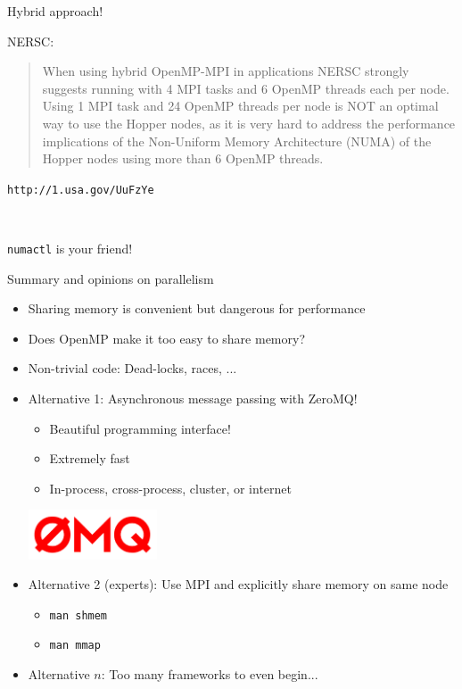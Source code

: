 \documentclass[sans,mathserif]{beamer}
\begin{document}
\begin{frame}{Hybrid approach!}

NERSC:
\begin{quote}
  When using hybrid OpenMP-MPI in applications NERSC strongly suggests
  running with 4 MPI tasks and 6 OpenMP threads each per node.  Using
  1 MPI task and 24 OpenMP threads per node is NOT an optimal way to
  use the Hopper nodes, as it is very hard to address the performance
  implications of the Non-Uniform Memory Architecture (NUMA) of the
  Hopper nodes using more than 6 OpenMP threads.
\end{quote}
{\small \tt http://1.usa.gov/UuFzYe}

~

{\tt numactl} is your friend!
\end{frame}

\begin{frame}{Summary and opinions on parallelism}
\begin{itemize}
  \item<+-> Sharing memory is convenient but dangerous for performance
  \item<+-> Does OpenMP make it too easy to share memory?
  \item<+-> Non-trivial code: Dead-locks, races, ...
  \item<+-> Alternative 1: Asynchronous message passing with ZeroMQ!
    \begin{itemize}
    \item Beautiful programming interface!
    \item Extremely fast
    \item In-process, cross-process, cluster, or internet
    \end{itemize}
    \includegraphics[width=0.3\textwidth]{zeromq.png}
  \item<+-> Alternative 2 (experts): Use MPI and explicitly share memory on same
     node
     \begin{itemize}
     \item {\tt man shmem}
     \item {\tt man mmap}
     \end{itemize}
   \item<+-> Alternative $n$: Too many frameworks to even begin...
\end{itemize}

\end{frame}
\end{document}
